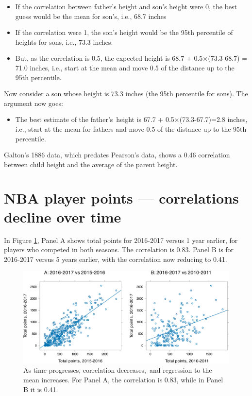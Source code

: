 \documentclass[
  10pt,
  b5paper]{book}
\providecommand{\tightlist}{%
  \setlength{\itemsep}{0pt}\setlength{\parskip}{0pt}}
\begin{document}
\begin{itemize}
\tightlist
\item
  If the correlation between father's height and son's height were 0, the best guess would be the mean for son's, i.e., 68.7 inches
\item
  If the correlation were 1, the son's height would be the 95th percentile of heights for sons, i.e., 73.3 inches.
\item
  But, as the correlation is 0.5, the expected height is 68.7 + 0.5\(\times\)(73.3-68.7) = 71.0 inches, i.e., start at the mean and move 0.5 of the distance up to the 95th percentile.
\end{itemize}

Now consider a son whose height is 73.3 inches (the 95th percentile for sons). The argument now goes:

\begin{itemize}
\tightlist
\item
  The best estimate of the father's~height is 67.7 + 0.5\(\times\)(73.3-67.7)=2.8 inches, i.e., start at the mean for fathers and move 0.5 of the distance up to the 95th percentile.
\end{itemize}

Galton's 1886 data, which predates Pearson's data, shows a 0.46 correlation between child height and the average of the parent height.

\hypertarget{nba-player-points-correlations-decline-over-time}{%
\section{NBA player points --- correlations decline over time}\label{nba-player-points-correlations-decline-over-time}}

In Figure \ref{fig:NBA}, Panel A shows total points for 2016-2017 versus 1 year earlier, for players who competed in both seasons. The correlation is 0.83. Panel B is for 2016-2017 versus 5 years earlier, with the correlation now reducing to 0.41.

\begin{figure}[H]

{\centering \includegraphics[width=1\linewidth]{07-regress_files/figure-latex/NBA-1} 

}

\caption{As time progresses, correlation decreases, and regression to the mean increases.  For Panel A, the correlation is 0.83, while in Panel B it is 0.41.}\label{fig:NBA}
\end{figure}
\end{document}
